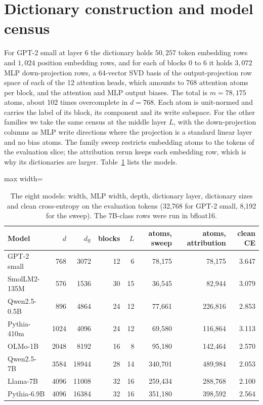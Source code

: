 \section{Dictionary construction and model census}\label{app:dict}
For GPT-2 small at layer 6 the dictionary holds $50{,}257$ token embedding rows and $1{,}024$ position embedding rows, and for each of blocks 0 to 6 it holds $3{,}072$ MLP down-projection rows, a 64-vector SVD basis of the output-projection row space of each of the 12 attention heads, which amounts to 768 attention atoms per block, and the attention and MLP output biases. The total is $m = 78{,}175$ atoms, about 102 times overcomplete in $d = 768$. Each atom is unit-normed and carries the label of its block, its component and its write subspace. For the other families we take the same census at the middle layer $L$, with the down-projection columns as MLP write directions where the projection is a standard linear layer and no bias atoms. The family sweep restricts embedding atoms to the tokens of the evaluation slice; the attribution rerun keeps each embedding row, which is why its dictionaries are larger. Table~\ref{app:census} lists the models.
\begin{table}[H]\centering\small
\caption{The eight models: width, MLP width, depth, dictionary layer, dictionary sizes and clean cross-entropy on the evaluation tokens (32{,}768 for GPT-2 small, 8{,}192 for the sweep). The 7B-class rows were run in bfloat16.}\label{app:census}
\begin{adjustbox}{max width=\linewidth}
\begin{tabular}{lrrrrrrr}\toprule
Model & $d$ & $d_{\mathrm{ff}}$ & blocks & $L$ & atoms, sweep & atoms, attribution & clean CE \\ \midrule
GPT-2 small & 768 & 3072 & 12 & 6 & 78,175 & 78,175 & 3.647 \\
SmolLM2-135M & 576 & 1536 & 30 & 15 & 36,545 & 82,944 & 3.079 \\
Qwen2.5-0.5B & 896 & 4864 & 24 & 12 & 77,661 & 226,816 & 2.853 \\
Pythia-410m & 1024 & 4096 & 24 & 12 & 69,580 & 116,864 & 3.113 \\
OLMo-1B & 2048 & 8192 & 16 & 8 & 95,180 & 142,464 & 2.570 \\
Qwen2.5-7B & 3584 & 18944 & 28 & 14 & 340,701 & 489,984 & 2.053 \\
Llama-7B & 4096 & 11008 & 32 & 16 & 259,434 & 288,768 & 2.100 \\
Pythia-6.9B & 4096 & 16384 & 32 & 16 & 351,180 & 398,592 & 2.564 \\
\bottomrule\end{tabular}\end{adjustbox}
\end{table}
